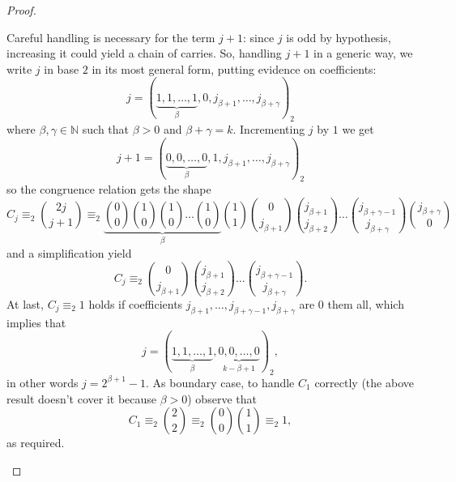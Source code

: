 \begin{proof}
\begin{itemize}
        Careful handling is necessary for the term $j+1$: 
        since $j$ is odd by hypothesis, increasing it could yield a chain of carries.
        So, handling $j+1$ in a generic way, we write
        $j$ in base $2$ in its most general form, putting evidence on coefficients:
        \begin{displaymath}
            j=\left(\underbrace{1,1,\ldots,1}_{\beta},0,j_{\beta+1},\ldots,j_{\beta+\gamma}\right)_{2}
        \end{displaymath}
        where $\beta,\gamma\in\mathbb{N}$ such that $\beta>0$ and $\beta+\gamma=k$. 
        Incrementing $j$ by $1$ we get
        \begin{displaymath}
            j+1=\left(\underbrace{0,0,\ldots,0}_{\beta},1,j_{\beta+1},\ldots,j_{\beta+\gamma}%
                \right)_{2}
        \end{displaymath}
        so the congruence relation gets the shape
        \begin{displaymath}
            C_{j}\equiv_{2}{{2j}\choose{j+1}}
                \equiv_{2} \underbrace{{{0}\choose{0}}{{1}\choose{0}}
                {{1}\choose{0}}\ldots{{1}\choose{0}}}_{\beta} 
                    {{1}\choose{1}}{{0}\choose{j_{\beta+1}}}{{j_{\beta+1}}\choose{j_{\beta+2}}}
                    \ldots{{j_{\beta+\gamma-1}}\choose{j_{\beta+\gamma}}}{{j_{\beta+\gamma}}\choose{0}}%
        \end{displaymath}
        and a simplification yield
        \begin{displaymath}
            C_{j}\equiv_{2} {{0}\choose{j_{\beta+1}}}
                {{j_{\beta+1}}\choose{j_{\beta+2}}}
                    \ldots{{j_{\beta+\gamma-1}}\choose{j_{\beta+\gamma}}}.
        \end{displaymath}
        At last, $C_{j}\equiv_{2} 1$ holds if coefficients 
            $j_{\beta+1}, \ldots, j_{\beta+\gamma-1},j_{\beta+\gamma}$
        are $0$ them all, which implies that
        \begin{displaymath}
            j=\left(\underbrace{1,1,\ldots,1}_{\beta},\underbrace{0,0,\ldots,0}_{k-\beta+1}\right)_{2},
        \end{displaymath}
        in other words $j = 2^{\beta+1}-1$. As boundary case, to handle $C_{1}$ correctly 
        (the above result doesn't cover it because $\beta>0$) observe that
        \begin{displaymath}
            C_{1}\equiv_{2} {{2}\choose{2}}\equiv_{2} {{0}\choose{0}}{{1}\choose{1}}\equiv_{2}1,
        \end{displaymath}
        as required.
\end{itemize}
\end{proof}


